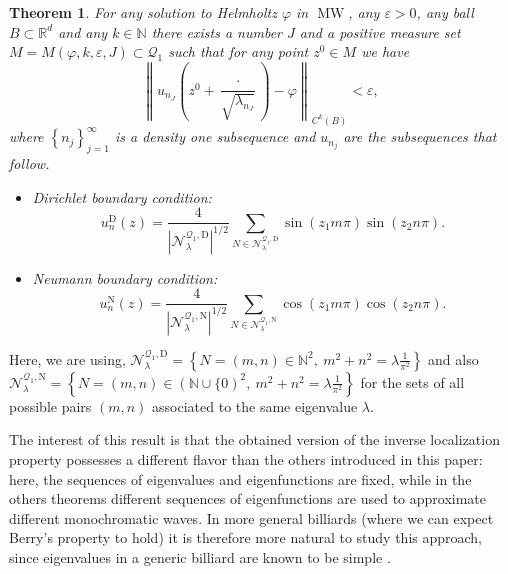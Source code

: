 \documentclass{amsart}
\newtheorem{theorem}{Theorem}[section]
\theoremstyle{definition}
\theoremstyle{remark}
\newcommand{\ep}{\varepsilon}
\newcommand{\vp}{\varphi}
\numberwithin{equation}{section}
\theoremstyle{definition}
\theoremstyle{remark}
\DeclareMathOperator\MW{MW}
\begin{document}
\begin{theorem}\label{BILSquare}
	For any solution to Helmholtz $\vp$ in $\MW$, any $\ep>0$, any ball $B\subset\mathbb{R}^d$ and any $k\in\mathbb{N}$ there exists a number $J$ and a positive measure set $M=M(\varphi,k,\ep,J)\subset \mathcal{Q}_1$ such that for any point $z^0\in M$ we have \begin{equation}
		\left\|u_{n_J}\left(z^0+\frac{\cdot}{\sqrt{\lambda_{n_J}}}\right)-\vp\right\|_{C^k(B)}<\ep,
	\end{equation}where $\left\{n_j\right\}_{j=1}^\infty$  is a density one subsequence and $u_{n_j}$ are the subsequences that follow.
	\begin{itemize}
		\item Dirichlet boundary condition:\begin{equation}
	u_{n}^\mathrm{D}(z)=\frac{4}{\left|\mathcal{N}_\lambda^{\mathcal{Q}_1,\mathrm{D}}\right|^{1/2}}\sum_{N\in\mathcal{N}_\lambda^{\mathcal{Q}_1,\mathrm{D}}}\sin\left(z_1m\pi\right)\sin\left(z_2n\pi\right).
\end{equation}
		\item Neumann boundary condition:
		 \begin{equation}
	u_{n}^\mathrm{N}(z)=\frac{4}{\left|\mathcal{N}_\lambda^{\mathcal{Q}_1,\mathrm{N}}\right|^{1/2}}\sum_{N\in\mathcal{N}_\lambda^{\mathcal{Q}_1,\mathrm{N}}}\cos\left(z_1m\pi\right)\cos\left(z_2n\pi\right).
\end{equation}
	\end{itemize}
\end{theorem}
Here, we are using, $\mathcal{N}_\lambda^{\mathcal{Q}_1,\mathrm{D}}=\left\{N=(m,n)\in\mathbb{N}^2,\ m^2+n^2=\lambda\frac{1}{\pi^2}\right\}$ and also $\mathcal{N}_\lambda^{\mathcal{Q}_1,\mathrm{N}}=\left\{N=(m,n)\in\left(\mathbb{N}\cup\{0\right)^2,\ m^2+n^2=\lambda\frac{1}{\pi^2}\right\}$ for the sets of all possible pairs $(m,n)$ associated to the same eigenvalue $\lambda$.

The interest of this result is that the obtained version of the inverse localization property possesses a different flavor than the others introduced in this paper: here, the sequences of eigenvalues and eigenfunctions are fixed, while in the others theorems different sequences of eigenfunctions are used to approximate different monochromatic waves. In more general billiards (where we can expect Berry's property to hold) it is therefore more natural to study this approach, since eigenvalues in a generic billiard are known to be simple \cite{Uhlen}. 
\end{document}
